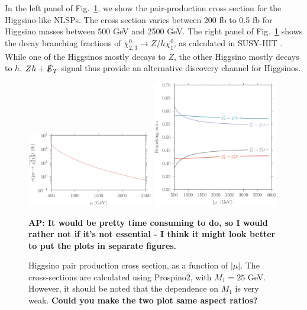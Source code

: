 \documentclass[a4paper,11pt]{article}
\newcommand{\Shufang}[1]{{\bf\color{Maroon}  #1}}
\newcommand{\Adarsh}[1]{{\bf\color{RoyalBlue} AP: #1}}
\newcommand{\image}[2]{\parbox{#1\textwidth}{\texttt{[image: images/\#2.pdf]}}}
\newcommand{\met}{{\slashed{E}_T}}
\begin{document}

In the left panel of Fig.~\ref{fig:xsection_plot}, we show the pair-production
cross section for the Higgsino-like NLSPs.  The cross section varies between
200 fb to 0.5 fb for Higgsino masses between 500 GeV and 2500 GeV. The right
panel of Fig.~\ref{fig:xsection_plot} shows the decay branching fractions of
$\chi_{2,3}^0\rightarrow Z/h \chi_1^0$, as calculated in SUSY-HIT \cite{Djouadi:2006bz}.
While one of the Higgsinos mostly decays to $Z$, the other
Higgsino mostly decays to $h$.  $Zh+\met$ signal thus provide an alternative
discovery channel for Higgsinos. 

\begin{figure}[h]
  \centering
  \includegraphics[width=0.49\textwidth]{images/higgsino_production_xsection.png}
  \includegraphics[width=0.49\textwidth]{images/higgsino_br_plot.png}
  \caption{Higgsino pair production cross section, as a function of $|\mu|$. The
  cross-sections are calculated using Prospino2, with $M_1 = 25$ GeV. However, it
  should be noted that the dependence on $M_1$ is very weak.  
  \Shufang{Could you make the two plot same aspect ratios?}}
  \Adarsh{It would be pretty time consuming to do, so I would rather not if
    it's not essential - I think it might look better to put the plots in
  separate figures.}
  \label{fig:xsection_plot}
\end{figure}
\end{document}
